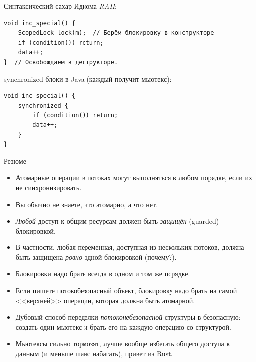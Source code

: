 \begin{frame}[fragile]{Синтаксический сахар}
	Идиома \textit{RAII}:
\begin{verbatim}
void inc_special() {
    ScopedLock lock(m);  // Берём блокировку в конструкторе
    if (condition()) return;
    data++;
}  // Освобождаем в деструкторе.
\end{verbatim}

	synchronized-блоки в Java (каждый получит мьютекс):
\begin{verbatim}
void inc_special() {
    synchronized {
        if (condition()) return;
        data++;
    }
}
\end{verbatim}
\end{frame}

\begin{frame}{Резюме}
	\begin{itemize}
		\item Атомарные операции в потоках могут выполняться в любом порядке, если их не синхронизировать.
		\item Вы обычно не знаете, что атомарно, а что нет.
		\item \textit{Любой} доступ к общим ресурсам должен быть \textit{защищён} (guarded) блокировкой.
		\item В частности, любая переменная, доступная из нескольких потоков, должна быть защищена \textit{ровно} одной блокировкой (почему?).
		\item Блокировки надо брать всегда в одном и том же порядке.
		\item Если пишете потокобезопасный объект, блокировку надо брать на самой <<верхней>> операции, которая должна быть атомарной.
		\item Дубовый способ переделки \textit{потоконебезопасной} структуры в безопасную: создать один мьютекс и брать его на каждую операцию со структурой.
		\item Мьютексы сильно тормозят, лучше вообще избегать общего доступа к данным (и меньше шанс набагать), привет из Rust.
	\end{itemize}
\end{frame}
